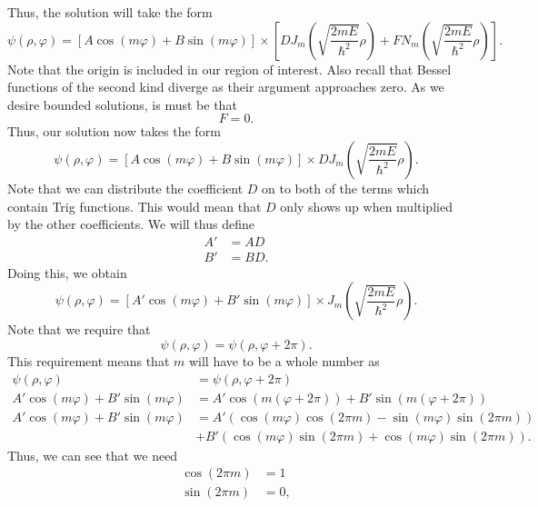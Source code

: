 \documentclass[11pt]{report}
\newcommand{\fpar}[1]{\left({#1}\right)}
\newcommand{\fbrac}[1]{\left[{#1}\right]}
\begin{document}
Thus, the solution will take the form
    \begin{equation*}
        \psi\fpar{\rho,\varphi} = \fbrac{A\cos\fpar{m\varphi}+B\sin\fpar{m\varphi}}\times\fbrac{DJ_m\fpar{\sqrt{\frac{2mE}{\hbar^2}}\rho}+FN_m\fpar{\sqrt{\frac{2mE}{\hbar^2}}\rho}}.
    \end{equation*}
Note that the origin is included in our region of interest. Also recall that Bessel functions of the second kind diverge as their argument approaches zero. As we desire bounded solutions, is must be that    
    \[F=0.\]
Thus, our solution now takes the form
    \begin{equation*}
        \psi\fpar{\rho,\varphi} = \fbrac{A\cos\fpar{m\varphi}+B\sin\fpar{m\varphi}}\times DJ_m\fpar{\sqrt{\frac{2mE}{\hbar^2}}\rho}.
    \end{equation*}
Note that we can distribute the coefficient $D$ on to both of the terms which contain Trig functions. This would mean that $D$ only shows up when multiplied by the other coefficients. We will thus define
    \begin{align*}
        A' &= AD\\
        B' &= BD.
    \end{align*}
Doing this, we obtain
    \begin{equation*}
        \psi\fpar{\rho,\varphi} = \fbrac{A'\cos\fpar{m\varphi}+B'\sin\fpar{m\varphi}}\times J_m\fpar{\sqrt{\frac{2mE}{\hbar^2}}\rho}.
    \end{equation*}
Note that we require that
    \begin{equation*}
        \psi\fpar{\rho,\varphi} = \psi\fpar{\rho,\varphi+2\pi}. 
    \end{equation*}
This requirement means that $m$ will have to be a whole number as
    \begin{align*}
        \psi\fpar{\rho,\varphi} &= \psi\fpar{\rho,\varphi+2\pi}\\
         A'\cos\fpar{m\varphi}+B'\sin\fpar{m\varphi}&= A'\cos\fpar{m\fpar{\varphi+2\pi}}+B'\sin\fpar{m\fpar{\varphi+2\pi}}  \\
         A'\cos\fpar{m\varphi}+B'\sin\fpar{m\varphi}&= A'\fpar{\cos\fpar{m\varphi}\cos\fpar{2\pi m}-\sin\fpar{m\varphi}\sin\fpar{2\pi m}}\\&+B'\fpar{\cos\fpar{m\varphi}\sin\fpar{2\pi m}+\cos\fpar{m\varphi}\sin\fpar{2\pi m}} .
    \end{align*}
Thus, we can see that we need
    \begin{align*}
        \cos\fpar{2\pi m} &=1\\
        \sin\fpar{2\pi m} &= 0,
    \end{align*}
\end{document}
